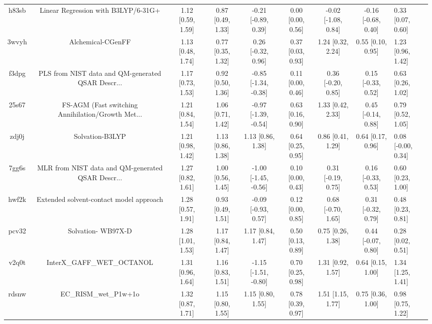 \documentclass{article}
\begin{document}
\begin{center}
\begin{longtable}{|cccccccc|}
 h83sb &                Linear Regression with B3LYP/6-31G+ &  1.12 [0.59, 1.59] &  0.87 [0.49, 1.33] &   -0.21 [-0.89, 0.39] &  0.00 [0.00, 0.56] &  -0.02 [-1.08, 0.84] &  -0.16 [-0.68, 0.40] &     0.33 [0.07, 0.60] \\
 3wvyh &                                  Alchemical-CGenFF &  1.13 [0.48, 1.74] &  0.77 [0.35, 1.32] &    0.26 [-0.32, 0.96] &  0.37 [0.03, 0.93] &    1.24 [0.32, 2.24] &    0.55 [0.10, 0.95] &     1.23 [0.96, 1.42] \\
 f3dpg &  PLS from NIST data and QM-generated QSAR Descr... &  1.17 [0.73, 1.53] &  0.92 [0.50, 1.36] &  -0.85 [-1.34, -0.38] &  0.11 [0.00, 0.46] &   0.36 [-0.20, 0.85] &   0.15 [-0.33, 0.52] &     0.63 [0.26, 1.02] \\
 25s67 &  FS-AGM (Fast switching Annihilation/Growth Met... &  1.21 [0.84, 1.54] &  1.06 [0.71, 1.42] &  -0.97 [-1.39, -0.54] &  0.63 [0.16, 0.90] &    1.33 [0.42, 2.33] &   0.45 [-0.14, 0.88] &     0.79 [0.52, 1.05] \\
 zdj0j &                                    Solvation-B3LYP &  1.21 [0.98, 1.42] &  1.13 [0.86, 1.38] &     1.13 [0.86, 1.38] &  0.64 [0.25, 0.95] &    0.86 [0.41, 1.29] &    0.64 [0.17, 0.96] &    0.08 [-0.00, 0.34] \\
 7gg6s &  MLR from NIST data and QM-generated QSAR Descr... &  1.27 [0.82, 1.61] &  1.00 [0.56, 1.45] &  -1.00 [-1.45, -0.56] &  0.10 [0.00, 0.43] &   0.31 [-0.19, 0.75] &   0.16 [-0.33, 0.53] &     0.60 [0.23, 1.00] \\
 hwf2k &            Extended solvent-contact model approach &  1.28 [0.57, 1.91] &  0.93 [0.49, 1.51] &   -0.09 [-0.93, 0.57] &  0.12 [0.00, 0.85] &   0.68 [-0.70, 1.65] &   0.31 [-0.32, 0.79] &     0.48 [0.23, 0.81] \\
 pcv32 &                                 Solvation- WB97X-D &  1.28 [1.01, 1.53] &  1.17 [0.84, 1.47] &     1.17 [0.84, 1.47] &  0.50 [0.13, 0.89] &    0.75 [0.26, 1.38] &   0.44 [-0.07, 0.80] &     0.28 [0.02, 0.51] \\
 v2q0t &                         InterX\_GAFF\_WET\_OCTANOL &  1.31 [0.96, 1.64] &  1.16 [0.83, 1.51] &  -1.15 [-1.51, -0.80] &  0.70 [0.25, 0.98] &    1.31 [0.92, 1.57] &    0.64 [0.15, 1.00] &     1.34 [1.25, 1.41] \\
 rdsnw &                              EC\_RISM\_wet\_P1w+1o &  1.32 [0.87, 1.71] &  1.15 [0.80, 1.55] &     1.15 [0.80, 1.55] &  0.78 [0.39, 0.97] &    1.51 [1.15, 1.77] &    0.75 [0.36, 1.00] &     0.98 [0.75, 1.22] \\

\end{longtable}
\end{center}
\end{document}
